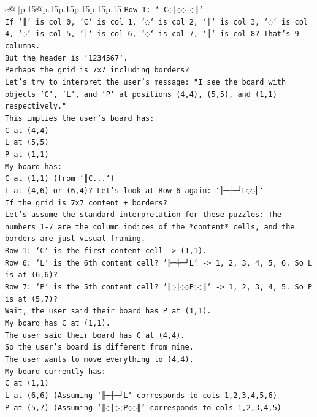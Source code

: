 \documentclass{article}
\begin{document}
{\begin{supertabular}{c@{$\;$}|p{.15\linewidth}@{}p{.15\linewidth}p{.15\linewidth}p{.15\linewidth}p{.15\linewidth}p{.15\linewidth}}
{{{\texttt{Row 1: `║C◌│◌◌│◌║`} \\
\texttt{If `║` is col 0, `C` is col 1, `◌` is col 2, `│` is col 3, `◌` is col 4, `◌` is col 5, `│` is col 6, `◌` is col 7, `║` is col 8? That's 9 columns.} \\
\texttt{But the header is `1234567`.} \\
\texttt{Perhaps the grid is 7x7 including borders?} \\
\texttt{Let's try to interpret the user's message: "I see the board with objects 'C', 'L', and 'P' at positions (4,4), (5,5), and (1,1) respectively."} \\
\texttt{This implies the user's board has:} \\
\texttt{C at (4,4)} \\
\texttt{L at (5,5)} \\
\texttt{P at (1,1)} \\
\texttt{My board has:} \\
\texttt{C at (1,1) (from `║C...`)} \\
\texttt{L at (4,6) or (6,4)? Let's look at Row 6 again: `╟─┼─┘L◌◌║`} \\
\texttt{If the grid is 7x7 content + borders?} \\
\texttt{Let's assume the standard interpretation for these puzzles: The numbers 1{-}7 are the column indices of the *content* cells, and the borders are just visual framing.} \\
\texttt{Row 1: `C` is the first content cell {-}> (1,1).} \\
\texttt{Row 6: `L` is the 6th content cell? `╟─┼─┘L` {-}> 1, 2, 3, 4, 5, 6. So L is at (6,6)?} \\
\texttt{Row 7: `P` is the 5th content cell? `║◌│◌◌P◌◌║` {-}> 1, 2, 3, 4, 5. So P is at (5,7)?} \\
\texttt{Wait, the user said their board has P at (1,1).} \\
\texttt{My board has C at (1,1).} \\
\texttt{The user said their board has C at (4,4).} \\
\texttt{So the user's board is different from mine.} \\
\texttt{The user wants to move everything to (4,4).} \\
\texttt{My board currently has:} \\
\texttt{C at (1,1)} \\
\texttt{L at (6,6) (Assuming `╟─┼─┘L` corresponds to cols 1,2,3,4,5,6)} \\
\texttt{P at (5,7) (Assuming `║◌│◌◌P◌◌║` corresponds to cols 1,2,3,4,5)} \\
}}}
\end{supertabular}}
\end{document}
